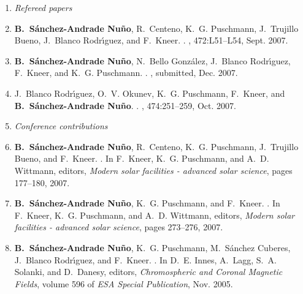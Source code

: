 \documentclass[goettingen,print,hyper]{thesis}
\begin{document}
\begin{enumerate}
\item[] \emph{Refereed papers}
\item
\textbf{B.~{S{\'a}nchez-Andrade Nu{\~n}o}}, R.~{Centeno}, K.~G. {Puschmann},
  J.~{Trujillo Bueno}, J.~{Blanco Rodr{\'{\i}}guez}, and F.~{Kneer}.
.
\newblock {\em \aap}, 472:L51--L54, Sept. 2007.
\item
\textbf{B.~{S{\'a}nchez-Andrade Nu{\~n}o}},  N.~Bello Gonz\'alez, J.~{Blanco Rodr{\'{\i}}guez}, F.~{Kneer},   and K.~G. {Puschmann}.
.
\newblock {\em \aap}, submitted, Dec. 2007.

\item
J.~{Blanco Rodr{\'{\i}}guez}, O.~V. {Okunev}, K.~G. {Puschmann}, F.~{Kneer},
  and \textbf{B.~{S{\'a}nchez-Andrade Nu{\~n}o}}.
.
\newblock {\em \aap}, 474:251--259, Oct. 2007.

\item[]  \emph{Conference contributions}
\item
\textbf{B.~{S{\'a}nchez-Andrade Nu{\~n}o}}, R.~{Centeno}, K.~G. {Puschmann},
  J.~{Trujillo Bueno}, and F.~{Kneer}.
.
\newblock In F.~{Kneer}, K.~G. {Puschmann}, and A.~D. {Wittmann}, editors, {\em
  Modern solar facilities - advanced solar science},
  pages 177--180, 2007.

\item
\textbf{B.~{S{\'a}nchez-Andrade Nu{\~n}o}}, K.~G. {Puschmann}, and F.~{Kneer}.
.
\newblock In F.~{Kneer}, K.~G. {Puschmann}, and A.~D. {Wittmann}, editors, {\em
  Modern solar facilities - advanced solar science},
  pages 273--276, 2007.

\item
\textbf{B.~{S{\'a}nchez-Andrade Nu{\~n}o}}, K.~G. {Puschmann}, M.~{S{\'a}nchez Cuberes},
  J.~{Blanco Rodr{\'{\i}}guez}, and F.~{Kneer}.
.
\newblock In D.~E. {Innes}, A.~{Lagg}, S.~A. {Solanki}, and D.~Danesy, editors, {\em
  Chromospheric and Coronal Magnetic Fields}, volume 596 of {\em ESA Special
  Publication}, Nov. 2005.


\end{enumerate}
\end{document}
